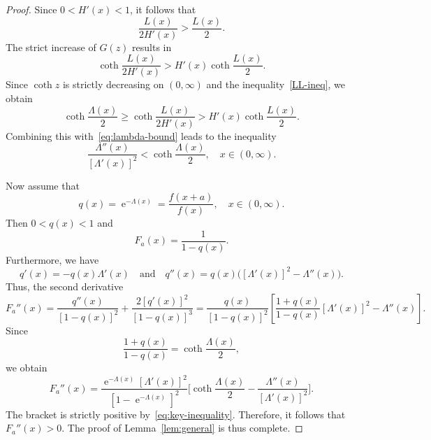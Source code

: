 \documentclass[10pt,a4paper]{amsart}
\DeclareMathOperator{\te}{e}
\begin{document}
\begin{proof}
Since $0<H'(x)<1$, it follows that
$$
\frac{L(x)}{2H'(x)}>\frac{L(x)}{2}.
$$
The strict increase of $G(z)$ results in
$$
\coth\frac{L(x)}{2H'(x)}>H'(x)\coth\frac{L(x)}{2}.
$$
Since $\coth z$ is strictly decreasing on $(0,\infty)$ and the inequality~\eqref{LL-ineq}, we obtain
$$
\coth\frac{\Lambda(x)}{2}
\geq
\coth\frac{L(x)}{2H'(x)}
>
H'(x)\coth\frac{L(x)}{2}.
$$
Combining this with~\eqref{eq:lambda-bound} leads to the inequality
\begin{equation}\label{eq:key-inequality}
\frac{\Lambda''(x)}{[\Lambda'(x)]^2}<\coth\frac{\Lambda(x)}{2}, \quad x\in(0,\infty).
\end{equation}
\par
Now assume that
$$
q(x)=\te^{-\Lambda(x)}=\frac{f(x+a)}{f(x)}, \quad x\in(0,\infty).
$$
Then $0<q(x)<1$ and
$$
F_a(x)=\frac1{1-q(x)}.
$$
Furthermore, we have
$$
q'(x)=-q(x)\Lambda'(x)\quad\text{and}\quad
q''(x)=q(x)\bigl([\Lambda'(x)]^2-\Lambda''(x)\bigr).
$$
Thus, the second derivative
$$
F_a''(x)=\frac{q''(x)}{[1-q(x)]^2}+\frac{2[q'(x)]^2}{[1-q(x)]^3}
=
\frac{q(x)}{[1-q(x)]^2}
\left[
\frac{1+q(x)}{1-q(x)}[\Lambda'(x)]^2-\Lambda''(x)
\right].
$$
Since
$$
\frac{1+q(x)}{1-q(x)}
=
\coth\frac{\Lambda(x)}{2},
$$
we obtain
$$
F_a''(x)
=
\frac{\te^{-\Lambda(x)}[\Lambda'(x)]^2}{[1-\te^{-\Lambda(x)}]^2}
\biggl[\coth\frac{\Lambda(x)}{2}-\frac{\Lambda''(x)}{[\Lambda'(x)]^2}\biggr].
$$
The bracket is strictly positive by~\eqref{eq:key-inequality}.
Therefore, it follows that $F_a''(x)>0$. The proof of Lemma~\ref{lem:general} is thus complete.
\end{proof}
\end{document}
